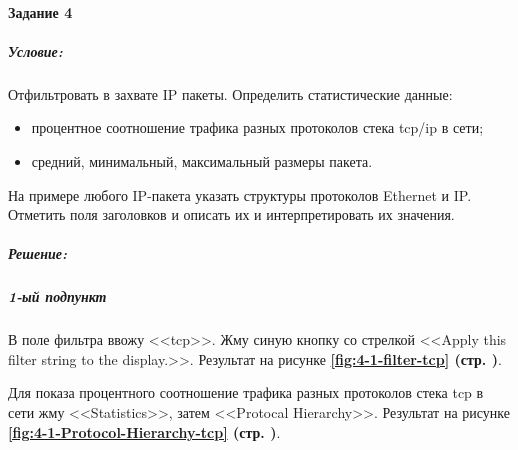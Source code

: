 \paragraph{Задание 4}
\subparagraph{Условие:}
Отфильтровать в захвате IP пакеты. Определить статистические данные:

\begin{itemize}
    \item процентное соотношение трафика разных протоколов стека tcp/ip в сети;
    \item средний, минимальный, максимальный размеры пакета.
\end{itemize}

На примере любого IP-пакета указать структуры протоколов Ethernet и IP. Отметить поля заголовков и описать их и интерпретировать их значения.

\subparagraph{Решение:} \hspace{0pt}

\subparagraph{1-ый подпункт} \hspace{0pt}

В поле фильтра ввожу <<tcp>>. Жму синую кнопку со стрелкой <<Apply this filter string to the display.>>.
Результат на рисунке \textbf{\ref{fig:4-1-filter-tcp} (стр. \pageref{fig:4-1-filter-tcp})}.

Для показа процентного соотношение трафика разных протоколов стека tcp в сети
жму <<Statistics>>, затем <<Protocal Hierarchy>>.
Результат на рисунке \textbf{\ref{fig:4-1-Protocol-Hierarchy-tcp} (стр. \pageref{fig:4-1-Protocol-Hierarchy-tcp})}.

